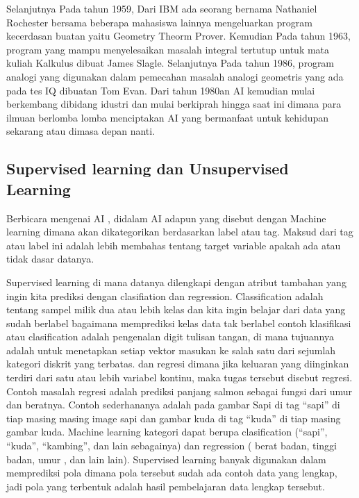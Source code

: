 \hspace{1cm} Selanjutnya Pada tahun 1959, Dari IBM ada seorang bernama Nathaniel Rochester bersama beberapa mahasiswa lainnya mengeluarkan program kecerdasan buatan yaitu Geometry Theorm Prover. Kemudian Pada tahun 1963, program yang  mampu menyelesaikan masalah integral tertutup untuk mata kuliah Kalkulus dibuat James Slagle. Selanjutnya Pada tahun 1986, program analogi yang digunakan dalam pemecahan masalah analogi geometris yang ada pada tes IQ dibuatan Tom Evan. Dari tahun 1980an AI kemudian mulai berkembang dibidang idustri dan mulai berkiprah hingga saat ini dimana para ilmuan berlomba lomba menciptakan AI yang bermanfaat untuk kehidupan sekarang atau dimasa depan nanti.

\subsection{Supervised learning dan Unsupervised Learning}
\hspace{1cm} Berbicara mengenai AI , didalam AI adapun yang disebut dengan Machine learning dimana akan dikategorikan berdasarkan label atau tag. Maksud dari tag atau label ini adalah lebih membahas tentang target variable apakah ada atau tidak dasar datanya. 
 
\hspace{1cm}Supervised learning   di mana datanya dilengkapi dengan atribut tambahan yang ingin kita prediksi dengan clasifiation dan regression. Classification adalah tentang sampel milik dua atau lebih kelas dan kita ingin belajar dari data yang sudah berlabel bagaimana memprediksi kelas data tak berlabel contoh klasifikasi atau clasification adalah pengenalan digit tulisan tangan, di mana tujuannya adalah untuk menetapkan setiap vektor masukan ke salah satu dari sejumlah kategori diskrit yang terbatas. dan regresi dimana jika keluaran yang diinginkan terdiri dari satu atau lebih variabel kontinu, maka tugas tersebut disebut regresi. Contoh masalah regresi adalah prediksi panjang salmon sebagai fungsi dari umur dan beratnya. Contoh sederhananya adalah pada gambar Sapi di tag “sapi” di tiap masing masing image sapi dan gambar kuda di tag “kuda” di tiap masing gambar kuda. Machine learning kategori dapat berupa clasification (“sapi”, “kuda”, “kambing”, dan lain sebagainya) dan regression ( berat badan, tinggi badan, umur , dan lain lain). Supervised learning banyak digunakan dalam memprediksi pola dimana pola tersebut sudah ada contoh data yang lengkap, jadi pola yang terbentuk adalah hasil pembelajaran data lengkap tersebut. 

